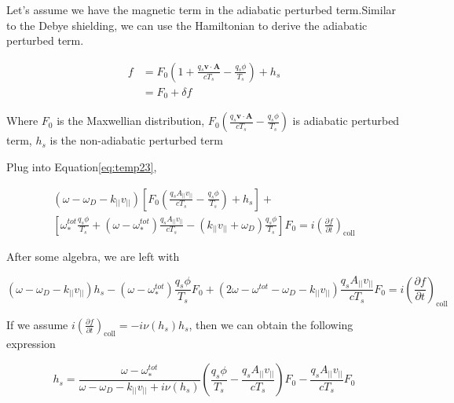 Let's assume we have the magnetic term in the adiabatic perturbed term.Similar to the Debye shielding, we can use the Hamiltonian to derive the adiabatic perturbed term. 

\begin{equation}
\begin{aligned}
    f{}&=F_0\left(1+\frac{q_s\textbf{v}\cdot \textbf{A}}{cT_s}-\frac{q_s\phi}{T_s} \right)+h_s\\
    &=F_0+\delta f
\end{aligned}
\end{equation}

Where $F_0$ is the Maxwellian distribution, $F_0\left(\frac{q_s\textbf{v}\cdot \textbf{A}}{cT_s}-\frac{q_s\phi}{T_s} \right)$ is adiabatic perturbed term, $h_s$ is the non-adiabatic perturbed term

Plug into Equation\ref{eq:temp23}, 

\begin{equation}
\begin{aligned}
    (\omega -\omega_D 
    - k_{||}v_{||})\left[F_0\left(\frac{q_sA_{||}v_{||}}{cT_s}-\frac{q_s\phi}{T_s} \right)+h_s\right]
    +\\
    \left[\omega_{*}^{tot}\frac{q_s\phi}{T_s}+
    (\omega-\omega^{tot}_*) \frac{q_s A_{||}v_{||}}{cT_s}-(k_{||}v_{||}+\omega_D)\frac{q_s\phi}{T_s}\right]F_0
    =i\left(\frac{\partial f}{\partial t}\right)_{\mathrm{coll}}
\end{aligned}
\end{equation}

After some algebra, we are left with

\begin{equation}
     (\omega -\omega_D 
    - k_{||}v_{||})h_s 
    -(\omega -\omega_*^{tot})\frac{q_s\phi}{T_s}F_0+(2\omega -\omega^{tot}-\omega_D-k_{||}v_{||})\frac{q_sA_{||}v_{||}}{cT_s}F_0
    =i\left(\frac{\partial f}{\partial t}\right)_{\mathrm{coll}}
\end{equation}

If we assume $i\left(\frac{\partial f}{\partial t}\right)_{\mathrm{coll}} = -i\nu(h_s) h_s$, then we can obtain the following expression

\begin{equation}
    h_s 
    =\frac{\omega -\omega_*^{tot} 
    }{\omega -\omega_D 
    - k_{||}v_{||}+i\nu(h_s)}\left(\frac{q_s\phi}{T_s}-\frac{q_sA_{||}v_{||}}{cT_s}\right)F_0 - \frac{q_sA_{||}v_{||}}{cT_s}F_0
    \label{eq:linear2}
\end{equation}

